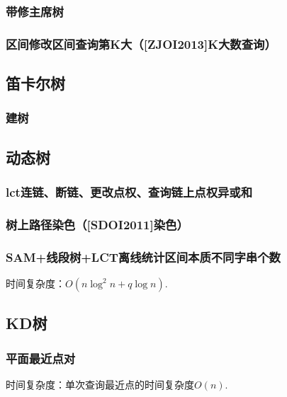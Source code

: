 \documentclass[landscape,twocolumn,twoside,a4paper]{article}
\begin{document}
\subsubsection{带修主席树}


\subsubsection{区间修改区间查询第K大（[ZJOI2013]K大数查询）}


\subsection{笛卡尔树}
\subsubsection{建树}



\subsection{动态树}

\subsubsection{lct连链、断链、更改点权、查询链上点权异或和}


\subsubsection{树上路径染色（[SDOI2011]染色）}


\subsubsection{SAM+线段树+LCT离线统计区间本质不同字串个数}
时间复杂度：$O(n\log^{2}n+q\log n)$.


\subsection{KD树}

\subsubsection{平面最近点对}
时间复杂度：单次查询最近点的时间复杂度$O(n).$

\end{document}
